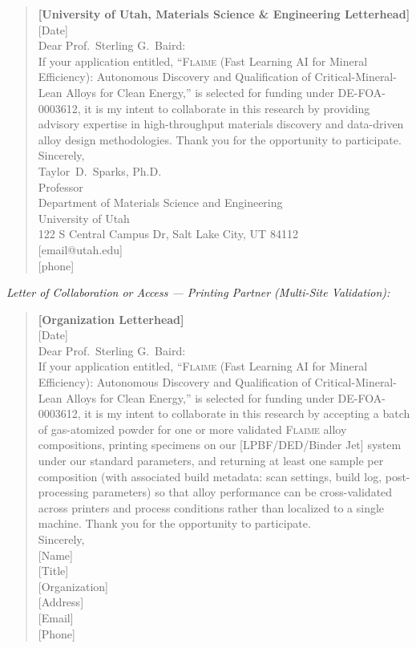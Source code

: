 \documentclass[11pt,letterpaper]{article}
\newcommand{\flaime}{\textsc{Flaime}}
\newcommand{\projecttitle}{\flaime{} (Fast Learning AI for Mineral
Efficiency): Autonomous Discovery and Qualification of
Critical-Mineral-Lean Alloys for Clean Energy}
\begin{document}
\begin{quote}\small
\textbf{{[}University of Utah, Materials Science \& Engineering Letterhead{]}}\\[4pt]
{[}Date{]}\\[6pt]
Dear Prof.\ Sterling G.\ Baird:\\[4pt]
If your application entitled, ``\projecttitle{},'' is selected for
funding under DE-FOA-0003612, it is my intent to collaborate in this
research by providing advisory expertise in high-throughput materials
discovery and data-driven alloy design methodologies.
Thank you for the opportunity to participate.\\[12pt]
Sincerely,\\[4pt]
Taylor~D.~Sparks, Ph.D.\\
Professor\\
Department of Materials Science and Engineering\\
University of Utah\\
122 S Central Campus Dr, Salt Lake City, UT 84112\\
{[}email@utah.edu{]}\\
{[}phone{]}
\end{quote}

\clearpage
\textit{Letter of Collaboration or Access --- Printing Partner (Multi-Site Validation):}

\begin{quote}\small
\textbf{{[}Organization Letterhead{]}}\\[4pt]
{[}Date{]}\\[6pt]
Dear Prof.\ Sterling G.\ Baird:\\[4pt]
If your application entitled, ``\projecttitle{},'' is selected for
funding under DE-FOA-0003612, it is my intent to collaborate in this
research by accepting a batch of gas-atomized powder for one or more
validated \flaime{} alloy compositions, printing specimens on our
{[}LPBF/DED/Binder Jet{]} system under our standard parameters, and
returning at least one sample per composition (with associated build
metadata: scan settings, build log, post-processing parameters) so that
alloy performance can be cross-validated across printers and process
conditions rather than localized to a single machine.
Thank you for the opportunity to participate.\\[12pt]
Sincerely,\\[4pt]
{[}Name{]}\\
{[}Title{]}\\
{[}Organization{]}\\
{[}Address{]}\\
{[}Email{]}\\
{[}Phone{]}
\end{quote}
\end{document}
